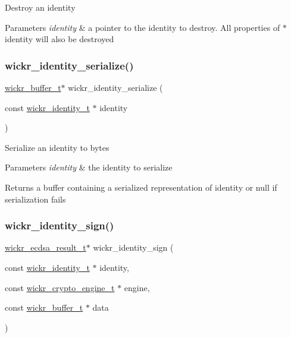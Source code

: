 Destroy an identity


\begin{DoxyParams}{Parameters}
{\em identity} & a pointer to the identity to destroy. All properties of \textquotesingle{}$\ast$identity\textquotesingle{} will also be destroyed \\
\hline
\end{DoxyParams}
\mbox{\label{group__wickr__identity_ga79ca0713d0b90873e584379f26cbd051}} 
\subsubsection{\texorpdfstring{wickr\+\_\+identity\+\_\+serialize()}{wickr\_identity\_serialize()}}
{\footnotesize\ttfamily \hyperlink{structwickr__buffer}{wickr\+\_\+buffer\+\_\+t}$\ast$ wickr\+\_\+identity\+\_\+serialize (\begin{DoxyParamCaption}\item[{const \hyperlink{structwickr__identity}{wickr\+\_\+identity\+\_\+t} $\ast$}]{identity }\end{DoxyParamCaption})}

Serialize an identity to bytes


\begin{DoxyParams}{Parameters}
{\em identity} & the identity to serialize \\
\hline
\end{DoxyParams}
\begin{DoxyReturn}{Returns}
a buffer containing a serialized representation of \textquotesingle{}identity\textquotesingle{} or null if serialization fails 
\end{DoxyReturn}
\mbox{\label{group__wickr__identity_ga32097764e57e70d85a2e1277146495c9}} 
\subsubsection{\texorpdfstring{wickr\+\_\+identity\+\_\+sign()}{wickr\_identity\_sign()}}
{\footnotesize\ttfamily \hyperlink{structwickr__ecdsa__result}{wickr\+\_\+ecdsa\+\_\+result\+\_\+t}$\ast$ wickr\+\_\+identity\+\_\+sign (\begin{DoxyParamCaption}\item[{const \hyperlink{structwickr__identity}{wickr\+\_\+identity\+\_\+t} $\ast$}]{identity,  }\item[{const \hyperlink{structwickr__crypto__engine}{wickr\+\_\+crypto\+\_\+engine\+\_\+t} $\ast$}]{engine,  }\item[{const \hyperlink{structwickr__buffer}{wickr\+\_\+buffer\+\_\+t} $\ast$}]{data }\end{DoxyParamCaption})}

